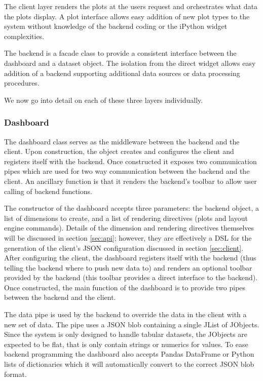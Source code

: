 \documentclass[letter,twocolumn]{article}
\begin{document}
The client layer renders the plots at the users request and orchestrates what data the plots display.
A plot interface allows easy addition of new plot types to the system without knowledge of the backend coding or the iPython widget complexities.

The backend is a facade class to provide a consistent interface between the dashboard and a dataset object.
The isolation from the direct widget allows easy addition of a backend supporting additional data sources or data processing procedures.

We now go into detail on each of these three layers individually.

\subsubsection{Dashboard}\label{sec:dashboard}

The dashboard class serves as the middleware between the backend and the client.
Upon construction, the object creates and configures the client and registers itself with the backend.
Once constructed it exposes two communication pipes which are used for two way communication between the backend and the client.
An ancillary function is that it renders the backend's toolbar to allow user calling of backend functions.

The constructor of the dashboard accepts three parameters: the backend object, a list of dimensions to create, and a list of rendering directives (plots and layout engine commands).
Details of the dimension and rendering directives themselves will be discussed in section \ref{sec:api}; however, they are effectively a DSL for the generation of the client's JSON configuration discussed in section \ref{sec:client}.
After configuring the client, the dashboard registers itself with the backend (thus telling the backend where to push new data to) and renders an optional toolbar provided by the backend (this toolbar provides a direct interface to the backend).
Once constructed, the main function of the dashboard is to provide two pipes between the backend and the client.

The data pipe is used by the backend to override the data in the client with a new set of data.  
The pipe uses a JSON blob containing a single JList of JObjects.
Since the system is only designed to handle tabular datasets, the JObjects are expected to be flat, that is only contain strings or numerics for values.
To ease backend programming the dashboard also accepts Pandas DataFrame or Python lists of dictionaries which it will automatically convert to the correct JSON blob format.
\end{document}
